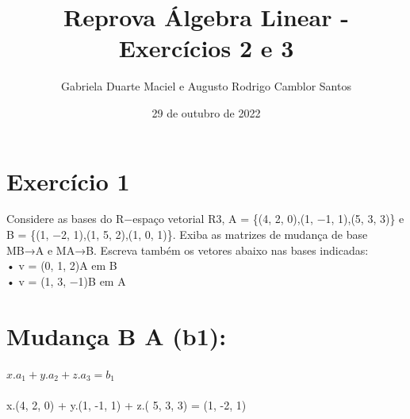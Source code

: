 \documentclass{article}
\title{Reprova Álgebra Linear - Exercícios 2 e 3}
\author{Gabriela Duarte Maciel e Augusto Rodrigo Camblor Santos }
\date{29 de outubro de 2022}
\begin{document}
\maketitle

\section{Exercício 1}\label{ex1}
Considere as bases do R−espaço vetorial R3, A = \{(4, 2, 0),(1, −1, 1),(5, 3, 3)\}  e
B = \{(1, −2, 1),(1, 5, 2),(1, 0, 1)\}. Exiba as matrizes de mudança de base MB→A e MA→B. Escreva também os
vetores abaixo nas bases indicadas:
\\• v = (0, 1, 2)A em B
\\• v = (1, 3, −1)B em A\\
\section{Mudança B \rightarrow A (b1):}
\textbf{$x. a_1 + y. a_2 + z. a_3 = b_1 $\\\\}
x.(4, 2, 0) + y.(1, -1, 1) + z.( 5, 3, 3) = (1, -2, 1) \\\\
\end{document}
